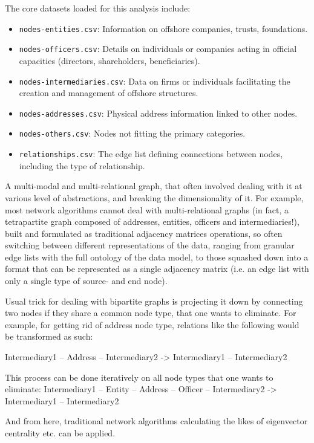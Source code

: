 The core datasets loaded for this analysis include:
\begin{itemize}
    \item \texttt{nodes-entities.csv}: Information on offshore companies, trusts, foundations.
    \item \texttt{nodes-officers.csv}: Details on individuals or companies acting in official capacities (directors, shareholders, beneficiaries).
    \item \texttt{nodes-intermediaries.csv}: Data on firms or individuals facilitating the creation and management of offshore structures.
    \item \texttt{nodes-addresses.csv}: Physical address information linked to other nodes.
    \item \texttt{nodes-others.csv}: Nodes not fitting the primary categories.
    \item \texttt{relationships.csv}: The edge list defining connections between nodes, including the type of relationship.
\end{itemize}
A multi-modal and multi-relational graph, that often involved dealing with it at various level of abstractions, and breaking the dimensionality of it. For example, most network algorithms cannot deal with multi-relational graphs (in fact, a tetrapartite graph composed of addresses, entities, officers and intermediaries!), built and formulated as traditional adjacency matrices operations, so often switching between different representations of the data, ranging from granular edge lists with the full ontology of the data model, to those squashed down into a format that can be represented as a single adjacency matrix (i.e. an edge list with only a single type of source- and end node).

Usual trick for dealing with bipartite graphs is projecting it down by connecting two nodes if they share a common node type, that one wants to eliminate. For example, for getting rid of address node type, relations like the following would be transformed as such:

Intermediary1 -- Address -- Intermediary2
-> Intermediary1 -- Intermediary2

This process can be done iteratively on all node types that one wants to eliminate:
Intermediary1 -- Entity -- Address -- Officer -- Intermediary2
-> Intermediary1 -- Intermediary2

And from here, traditional network algorithms calculating the likes of eigenvector centrality etc. can be applied.

